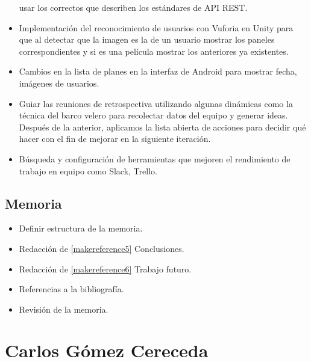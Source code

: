 \begin{itemize}
            usar los correctos que describen los estándares de API REST.
            \item Implementación del reconocimiento de usuarios con Vuforia en Unity
             para que al detectar que la imagen es la de un usuario mostrar los
             paneles correspondientes y si es una película mostrar los anteriores
             ya existentes.
            \item Cambios en la lista de planes en la interfaz de Android para
             mostrar fecha, imágenes de usuarios.
            \item Guiar las reuniones de retrospectiva utilizando algunas dinámicas
             como la técnica del barco velero para recolectar datos del equipo y
             generar ideas. Después de la anterior, aplicamos la lista abierta de
             acciones para decidir qué hacer con el fin de mejorar en la
             siguiente iteración.
            \item Búsqueda y configuración de herramientas que mejoren el
             rendimiento de trabajo en equipo como Slack, Trello.
        \end{itemize}
    \subsection{Memoria}
    \label{makereference7.2.3}
        \begin{itemize}
            \item Definir estructura de la memoria.
            \item Redacción de \autoref{makereference5} Conclusiones.
            \item Redacción de \autoref{makereference6} Trabajo futuro.
            \item Referencias a la bibliografía.
            \item Revisión de la memoria.
        \end{itemize}

        \section{Carlos Gómez Cereceda}
        \label{makereference7.3}
